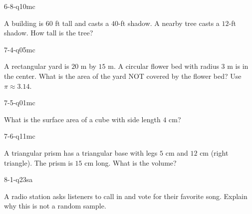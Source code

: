 \begin{practiceQuestion}{6-8-q10}{mc}
\begin{questionText}
A building is $60$ ft tall and casts a $40$-ft shadow. A nearby tree casts a $12$-ft shadow. How tall is the tree?
\end{questionText}
\end{practiceQuestion}

\begin{practiceQuestion}{7-4-q05}{mc}
\begin{questionText}
A rectangular yard is $20$ m by $15$ m. A circular flower bed with radius $3$ m is in the center. What is the area of the yard NOT covered by the flower bed? Use $\pi \approx 3.14$.
\end{questionText}
\end{practiceQuestion}

\begin{practiceQuestion}{7-5-q01}{mc}
\begin{questionText}
What is the surface area of a cube with side length $4$ cm?
\end{questionText}
\end{practiceQuestion}

\begin{practiceQuestion}{7-6-q11}{mc}
\begin{questionText}
A triangular prism has a triangular base with legs $5$ cm and $12$ cm (right triangle). The prism is $15$ cm long. What is the volume?
\end{questionText}
\end{practiceQuestion}

\begin{practiceQuestion}{8-1-q23}{sa}
\begin{questionText}
A radio station asks listeners to call in and vote for their favorite song. Explain why this is not a random sample.
\end{questionText}
\end{practiceQuestion}

